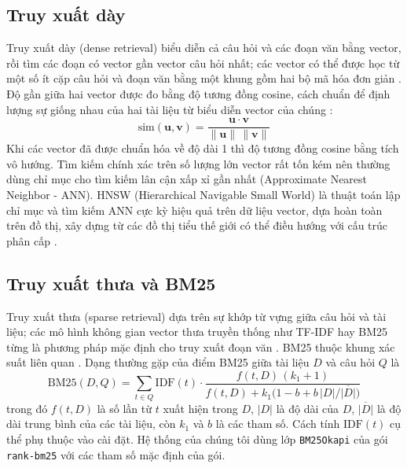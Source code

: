 \subsection{Truy xuất dày}

Truy xuất dày (dense retrieval) biểu diễn cả câu hỏi và các đoạn văn bằng vector, rồi tìm các đoạn có vector gần vector câu hỏi nhất; các vector có thể được học từ một số ít cặp câu hỏi và đoạn văn bằng một khung gồm hai bộ mã hóa đơn giản \cite{karpukhin2020dpr}. Độ gần giữa hai vector được đo bằng độ tương đồng cosine, cách chuẩn để định lượng sự giống nhau của hai tài liệu từ biểu diễn vector của chúng \cite{manning2008ir}:
\begin{equation}\label{eq:cosine}
    \mathrm{sim}(\mathbf{u},\mathbf{v}) = \frac{\mathbf{u}\cdot\mathbf{v}}{\lVert\mathbf{u}\rVert\,\lVert\mathbf{v}\rVert}
\end{equation}
Khi các vector đã được chuẩn hóa về độ dài 1 thì độ tương đồng cosine bằng tích vô hướng. Tìm kiếm chính xác trên số lượng lớn vector rất tốn kém nên thường dùng chỉ mục cho tìm kiếm lân cận xấp xỉ gần nhất (Approximate Nearest Neighbor - ANN). HNSW (Hierarchical Navigable Small World) là thuật toán lập chỉ mục và tìm kiếm ANN cực kỳ hiệu quả trên dữ liệu vector, dựa hoàn toàn trên đồ thị, xây dựng từ các đồ thị tiểu thế giới có thể điều hướng với cấu trúc phân cấp \cite{malkov2020hnsw}.

\subsection{Truy xuất thưa và BM25}

Truy xuất thưa (sparse retrieval) dựa trên sự khớp từ vựng giữa câu hỏi và tài liệu; các mô hình không gian vector thưa truyền thống như TF-IDF hay BM25 từng là phương pháp mặc định cho truy xuất đoạn văn \cite{karpukhin2020dpr}. BM25 thuộc khung xác suất liên quan \cite{robertson2009bm25}. Dạng thường gặp của điểm BM25 giữa tài liệu $D$ và câu hỏi $Q$ là
\begin{equation}\label{eq:bm25}
    \mathrm{BM25}(D,Q) = \sum_{t\in Q} \mathrm{IDF}(t)\cdot \frac{f(t,D)\,(k_1+1)}{f(t,D) + k_1\bigl(1 - b + b\,\lvert D\rvert / \overline{\lvert D\rvert}\bigr)}
\end{equation}
trong đó $f(t,D)$ là số lần từ $t$ xuất hiện trong $D$, $\lvert D\rvert$ là độ dài của $D$, $\overline{\lvert D\rvert}$ là độ dài trung bình của các tài liệu, còn $k_1$ và $b$ là các tham số. Cách tính $\mathrm{IDF}(t)$ cụ thể phụ thuộc vào cài đặt. Hệ thống của chúng tôi dùng lớp \texttt{BM25Okapi} của gói \texttt{rank-bm25} với các tham số mặc định của gói.

